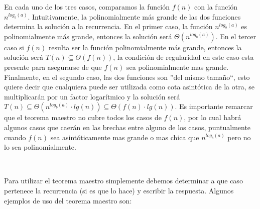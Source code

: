 En cada uno de los tres casos, comparamos la funci\'on $f(n)$ con la funci\'on $n^{log_b(a)}$. Intuitivamente, la polinomialmente m\'as grande de las dos funciones determina la soluci\'on a la recurrencia. En el primer caso, la funci\'on $n^{log_b(a)}$ es polinomialmente m\'as grande, entonces la soluci\'on ser\'a $\Theta(n^{log_b(a)})$. En el tercer caso si $f(n)$ resulta ser la funci\'on polinomialmente m\'as grande, entonces la soluci\'on ser\'a $T(n) \subseteq \Theta(f(n))$, la condici\'on de regularidad en este caso esta presente para asegurarse de que $f(n)$ sea polinomialmente mas grande. Finalmente, en el segundo caso, las dos funciones son ''del mismo tama\~no``, esto quiere decir que cualquiera puede ser utilizada como cota asint\'otica de la otra, se multiplicar\'an por un factor logar\'itmico y la soluci\'on ser\'a $T(n) \subseteq \Theta(n^{log_b(a)} \cdot lg(n)) \subseteq \Theta(f(n) \cdot lg(n))$. Es importante remarcar que el teorema maestro no cubre todos los casos de $f(n)$, por lo cual habr\'a algunos casos que caer\'an en las brechas entre alguno de los casos, puntualmente cuando $f(n)$ sea asint\'oticamente mas grande o mas chica que $n^{log_b(a)}$ pero no lo sea polinomialmente.

~

Para utilizar el teorema maestro simplemente debemos determinar a que caso pertenece la recurrencia (si es que lo hace) y escribir la respuesta. Algunos ejemplos de uso del teorema maestro son:

